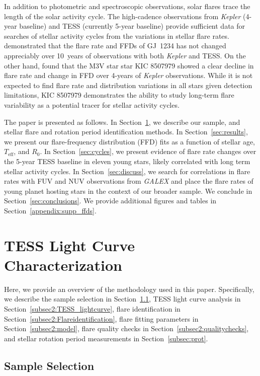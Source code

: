 \documentclass[twocolumn, linenumbers]{aastex631}
\begin{document}
In addition to photometric and spectroscopic observations, solar flares trace the length of the solar activity cycle. The high-cadence observations from \textit{Kepler} (4-year baseline)
and TESS (currently 5-year baseline) provide  sufficient data for searches of stellar activity cycles from the variations in stellar flare rates. \cite{davenport20} demonstrated that
the flare rate and FFDs of GJ~1234 has not changed appreciably over 10~years of observations with both \textit{Kepler} and TESS. On the other hand, \cite{scoggins19} found that the M3V
star star KIC 8507979 showed a clear decline in flare rate and change in FFD over 4-years of \textit{Kepler} observations. While it is not expected to find flare rate and distribution
variations in all stars given detection limitations, KIC 8507979 demonstrates the ability to study long-term flare variability as a potential tracer for stellar activity cycles.

The paper is presented as follows. In Section~\ref{sec:methods}, we describe our sample, and stellar flare and rotation period identification methods. In Section~\ref{sec:results},
we present our flare-frequency distribution (FFD) fits as a function of stellar age, $T_\textrm{eff}$, and $R_0$. In Section~\ref{sec:cycles}, we present evidence of flare rate changes
over the 5-year TESS baseline in eleven young stars, likely correlated with long term stellar activity cycles. In Section~\ref{sec:discuss}, we search for correlations in flare rates
with FUV and NUV observations from \textit{GALEX} and place the flare rates of young planet hosting stars in the context of our broader sample.  We conclude in Section~\ref{sec:conclusions}.
We provide additional figures and tables in Section~\ref{appendix:supp_ffds}.


\section{TESS Light Curve Characterization}\label{sec:methods}

Here, we provide an overview of the methodology used in this paper. Specifically, we describe the sample selection in Section~\ref{subsec2:sample}, TESS light curve analysis in
Section~\ref{subsec2:TESS_lightcurve}, flare identification in Section~\ref{subsec2:Flareidentification}, flare fitting parameters in Section~\ref{subsec2:model}, flare quality
checks in Section~\ref{subsec2:qualitychecks}, and  stellar rotation period measurements in Section~\ref{subsec:prot}.

\subsection{Sample Selection}\label{subsec2:sample}
\end{document}
